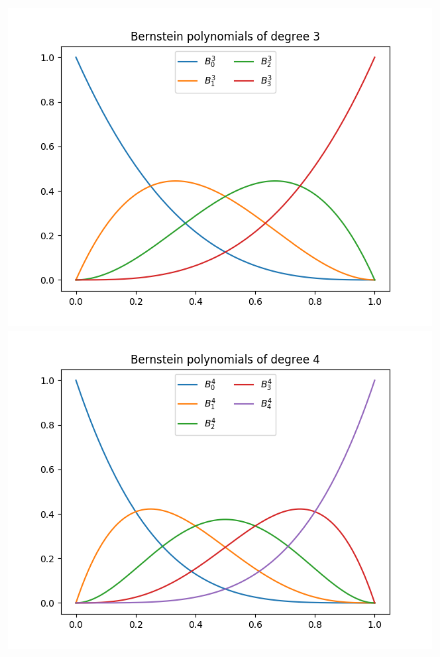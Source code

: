\begin{figure}[ht!]
\begin{minipage}[t]{0.43\textwidth}
\end{minipage}
\begin{minipage}[t]{0.43\textwidth}
  \centering
  \includegraphics[width=1.0\textwidth]{figures/cad/all_bernstein_degree_3}
\end{minipage}
\begin{minipage}[t]{0.43\textwidth}
  \centering
  \includegraphics[width=1.0\textwidth]{figures/cad/all_bernstein_degree_4}
\end{minipage}
\begin{minipage}[t]{0.43\textwidth}
  \centering

\end{minipage}
\end{figure}
